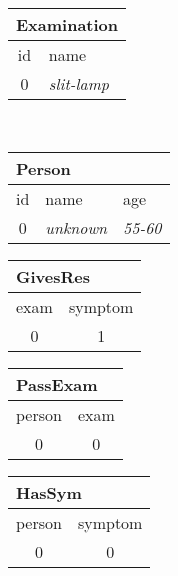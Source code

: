 \begin{figure}[p]
\begin{minipage}[][\textheight][c]{\textwidth}
\begin{subfigure}{\linewidth}
\begin{adjustbox}{varwidth=\linewidth, max height=.2\textheight}
\begin{tabular}[t]{c|l}
                    \multicolumn{2}{l}{\textbf{Examination}} \\
                    \hline
                    \hline
                    id & name                                \\
                    \hline
                    0  & \emph{slit-lamp}
                \end{tabular}\\
                \vspace{1em}
                \begin{tabular}[t]{c|l|l}
                    \multicolumn{2}{l}{\textbf{Person}} \\
                    \hline
                    \hline
                    id & name           & age           \\
                    \hline
                    0  & \emph{unknown} & \emph{55-60}  \\
                \end{tabular}
                \quad\hfill
                \begin{tabular}[t]{c|c}
                    \multicolumn{2}{l}{\textbf{GivesRes}} \\
                    \hline
                    \hline
                    exam & symptom                        \\
                    \hline
                    0    & 1                              \\
                \end{tabular}
                \quad\hfill
                \begin{tabular}[t]{c|c}
                    \multicolumn{2}{l}{\textbf{PassExam}} \\
                    \hline
                    \hline
                    person & exam                         \\
                    \hline
                    0      & 0                            \\
                \end{tabular}
                \quad\hfill
                \begin{tabular}[t]{c|c}
                    \multicolumn{2}{l}{\textbf{HasSym}} \\
                    \hline
                    \hline
                    person & symptom                    \\
                    \hline
                    0      & 0                          \\

\end{tabular}
\end{adjustbox}
\end{subfigure}
\end{minipage}
\end{figure}
